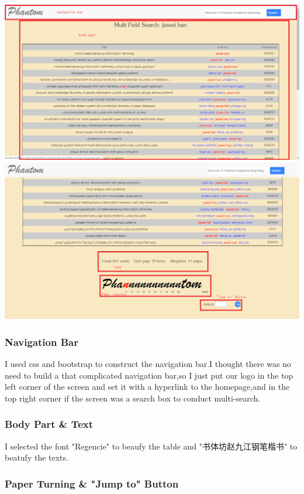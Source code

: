 \documentclass[10pt,twoside,a4paper,titlepage]{article}
\begin{document}
	\includegraphics[width=1.0\textwidth]{cyf/SEARCH_struct1.png}
	\newline
	\includegraphics[width=1.0\textwidth]{cyf/SEARCH_2_struct2.png}
	
	
	\subsubsection{Navigation Bar}
	
	I used css and bootstrap to construct the navigation bar.I thought there was no need to build a  that complicated navigation bar,so I just put our logo in the top left corner of the screen and set it with a hyperlink to the homepage,and in the top right corner if the screen was a search box to conduct multi-search.
	
	\subsubsection{Body Part \& Text}
	
	I selected the font "Regencie" to beaufy the table and "书体坊赵九江钢笔楷书" to beatufy the texts.
	
	\subsubsection{Paper Turning \& "Jump to" Button }
	
\end{document}
